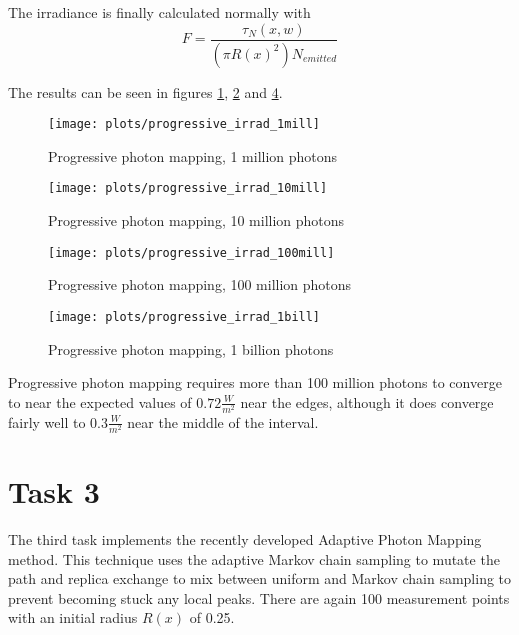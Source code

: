 The irradiance is finally calculated normally with
$$ F = \frac{\tau_{N}(x, w)}{(\pi R(x)^2) N_{emitted}} $$

The results can be seen in figures \ref{fig:progressive_irrad1}, \ref{fig:progressive_irrad10} and \ref{fig:progressive_irrad100}.

\begin{figure}[h]
    \centering
    \texttt{[image: plots/progressive\_irrad\_1mill]}\\
    \caption{Progressive photon mapping, 1 million photons}
    \label{fig:progressive_irrad1}
\end{figure}

\begin{figure}
    \centering
    \texttt{[image: plots/progressive\_irrad\_10mill]}\\
    \caption{Progressive photon mapping, 10 million photons}
    \label{fig:progressive_irrad10}
\end{figure}

\begin{figure}
    \centering
    \texttt{[image: plots/progressive\_irrad\_100mill]}\\
    \caption{Progressive photon mapping, 100 million photons}
    \label{fig:progressive_irrad100}
\end{figure}

\begin{figure}
    \centering
    \texttt{[image: plots/progressive\_irrad\_1bill]}\\
    \caption{Progressive photon mapping, 1 billion photons}
    \label{fig:progressive_irrad100}
\end{figure}

Progressive photon mapping requires more than 100 million photons to converge to near the expected values of $0.72 \frac{W}{m^2}$ near the edges, although it does converge fairly well to $0.3 \frac{W}{m^2} $ near the middle of the interval. 

\section*{Task 3}
The third task implements the recently developed Adaptive Photon Mapping method. This technique uses the adaptive Markov chain sampling to mutate the path and replica exchange to mix between uniform and Markov chain sampling to prevent becoming stuck any local peaks. There are again 100 measurement points with an initial radius $ R(x) $ of 0.25. 

